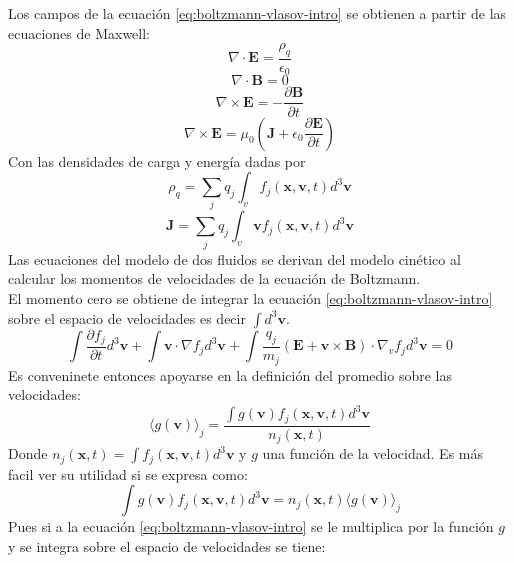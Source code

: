 \documentclass[../tesis_main_file.tex]{subfiles}
\begin{document}
Los campos de la ecuación \ref{eq:boltzmann-vlasov-intro} se obtienen a partir de las ecuaciones de Maxwell:
\begin{equation}
\nabla \cdot \textbf{E}=\frac{\rho_q}{\epsilon _0}
\end{equation}
\begin{equation}
\nabla \cdot \textbf{B}=0
\end{equation}
\begin{equation}
\nabla \times \textbf{E}=-\frac{\partial \textbf{B}}{\partial t}
\end{equation}
\begin{equation}
\nabla \times \textbf{E} = \mu _0 \left(\textbf{J}+\epsilon_0\frac{\partial \textbf{E}}{\partial t} \right)
\end{equation}
Con las densidades de carga y energía dadas por
\begin{equation}
\rho_q = \sum_j q_j \int_v f_j(\textbf{x},\textbf{v},t) d^3 \textbf{v}
\end{equation}
\begin{equation}
\textbf{J}= \sum_j q_j \int_v \textbf{v}f_j(\textbf{x},\textbf{v},t) d^3 \textbf{v}
\end{equation}
Las ecuaciones del modelo de dos fluidos se derivan del modelo cinético al calcular los momentos de velocidades de la ecuación de Boltzmann.\\
El momento cero se obtiene de integrar la ecuación \ref{eq:boltzmann-vlasov-intro} sobre el espacio de velocidades es decir $\int d^3 \textbf{v}$.
\begin{equation}
 \int \frac{\partial f_j}{\partial t}d^3 \textbf{v}+ \int \textbf{v}\cdot \nabla f_j d^3 \textbf{v} + \int \frac{q_j}{m_j}\left( \textbf{E} + \textbf{v} \times \textbf{B}\right)\cdot \nabla _v f_j d^3 \textbf{v}=0
\end{equation}
Es conveninete entonces apoyarse en la definición del promedio sobre las velocidades:
\begin{equation}
\langle g(\textbf{v}) \rangle _j = \frac{\int g(\textbf{v})f_j(\textbf{x},\textbf{v},t)d^3\textbf{v}}{n_j(\textbf{x},t)}
\end{equation}
Donde $n_j(\textbf{x},t)=\int f_j(\textbf{x},\textbf{v},t) d^3\textbf{v}$ y $g$ una función de la velocidad. Es más facil ver su utilidad si se expresa como:
\begin{equation}
\int g(\textbf{v})f_j(\textbf{x},\textbf{v},t)d^3\textbf{v}= n_j(\textbf{x},t)\langle g(\textbf{v}) \rangle _j
\end{equation}
Pues si a la ecuación \ref{eq:boltzmann-vlasov-intro} se le multiplica por la función $g$ y se integra sobre el espacio de velocidades se tiene:
\end{document}
